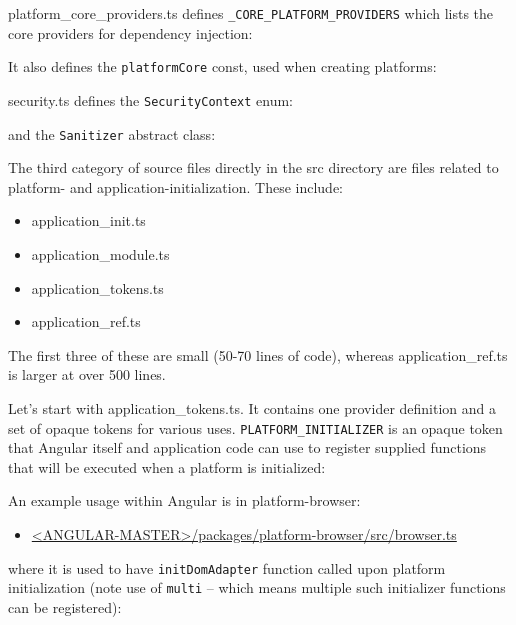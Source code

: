 platform\_core\_providers.ts defines
\texttt{\_CORE\_PLATFORM\_PROVIDERS}
which lists the core
providers for dependency injection:



It also defines the
\texttt{platformCore}
const, used when creating platforms:



security.ts defines the
\texttt{SecurityContext}
enum:



and the
\texttt{Sanitizer}
abstract class:



The third category of source files directly in the src directory are files related to
platform- and application-initialization. These include:

\begin{itemize}
  \item application\_init.ts
  \item application\_module.ts
  \item application\_tokens.ts
  \item application\_ref.ts
\end{itemize}

The first three of these are small (50-70 lines of code), whereas application\_ref.ts is
larger at over 500 lines.

Let’s start with application\_tokens.ts. It contains one provider definition and a set of
opaque tokens for various uses.
\texttt{PLATFORM\_INITIALIZER}
is an opaque token that
Angular itself and application code can use to register supplied functions that will be
executed when a platform is initialized:



An example usage within Angular is in platform-browser:

\begin{itemize}
  \item \href{https://github.com/angular/angular/blob/master/packages/platform-browser/src/browser.ts}
        {<ANGULAR-MASTER>/packages/platform-browser/src/browser.ts}
\end{itemize}

where it is used to have
\texttt{initDomAdapter}
function called upon platform initialization
(note use of
\texttt{multi}
– which means multiple such initializer functions can be
registered):

